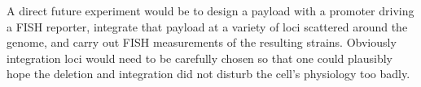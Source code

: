 A direct  future experiment would be
to design a payload with a promoter driving a FISH reporter,
integrate that payload at a variety of loci scattered around the genome,
and carry out FISH measurements of the resulting strains.
Obviously integration loci would need to be carefully chosen so
that one could plausibly hope the deletion and integration did
not disturb the cell's physiology too badly.
